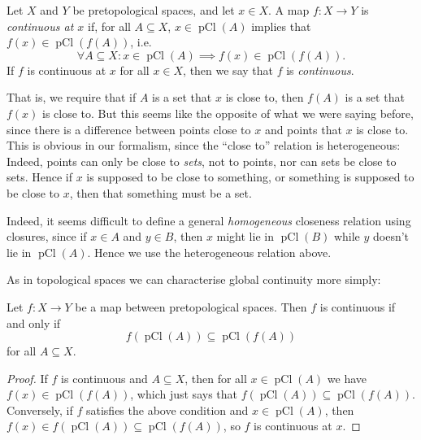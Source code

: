 \documentclass[article, a4paper, 11pt, oneside]{memoir}
\numberwithin{equation}{chapter}
\newcommand{\pCl}[1]{\operatorname{pCl}(#1)}
\begin{document}
\begin{definition}[Continuity]
    Let $X$ and $Y$ be pretopological spaces, and let $x \in X$. A map $f \colon X \to Y$ is \emph{continuous at $x$} if, for all $A \subseteq X$, $x \in \pCl{A}$ implies that $f(x) \in \pCl{f(A)}$, i.e.
    \begin{equation*}
        \forall A \subseteq X \colon x \in \pCl{A} \implies f(x) \in \pCl{f(A)}.
    \end{equation*}
    If $f$ is continuous at $x$ for all $x \in X$, then we say that $f$ is \emph{continuous}.
\end{definition}
%
That is, we require that if $A$ is a set that $x$ is close to, then $f(A)$ is a set that $f(x)$ is close to. But this seems like the opposite of what we were saying before, since there is a difference between points close to $x$ and points that $x$ is close to. This is obvious in our formalism, since the \enquote{close to} relation is heterogeneous: Indeed, points can only be close to \emph{sets}, not to points, nor can sets be close to sets. Hence if $x$ is supposed to be close to something, or something is supposed to be close to $x$, then that something must be a set.

Indeed, it seems difficult to define a general \emph{homogeneous} closeness relation using closures, since if $x \in A$ and $y \in B$, then $x$ might lie in $\pCl{B}$ while $y$ doesn't lie in $\pCl{A}$. Hence we use the heterogeneous relation above.

As in topological spaces we can characterise global continuity more simply:

\begin{proposition}
    Let $f \colon X \to Y$ be a map between pretopological spaces. Then $f$ is continuous if and only if
    \begin{equation*}
        f(\pCl{A})
            \subseteq \pCl{f(A)}
    \end{equation*}
    for all $A \subseteq X$.
\end{proposition}

\begin{proof}
    If $f$ is continuous and $A \subseteq X$, then for all $x \in \pCl{A}$ we have $f(x) \in \pCl{f(A)}$, which just says that $f(\pCl{A}) \subseteq \pCl{f(A)}$. Conversely, if $f$ satisfies the above condition and $x \in \pCl{A}$, then $f(x) \in f(\pCl{A}) \subseteq \pCl{f(A)}$, so $f$ is continuous at $x$.
\end{proof}
\end{document}
